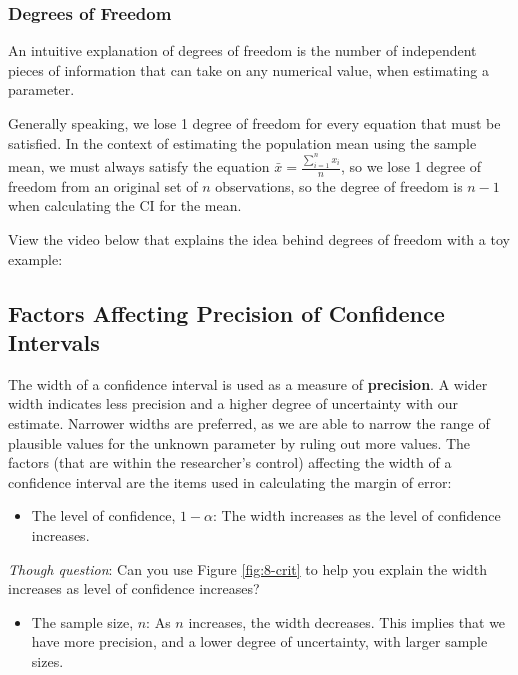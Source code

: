 \documentclass[
]{book}
\providecommand{\tightlist}{%
  \setlength{\itemsep}{0pt}\setlength{\parskip}{0pt}}
\begin{document}
\subsubsection{Degrees of Freedom}\label{degrees-of-freedom}

An intuitive explanation of degrees of freedom is the number of independent pieces of information that can take on any numerical value, when estimating a parameter.

Generally speaking, we lose 1 degree of freedom for every equation that must be satisfied. In the context of estimating the population mean using the sample mean, we must always satisfy the equation \(\bar{x} = \frac{\sum_{i=1}^n x_i}{n}\), so we lose 1 degree of freedom from an original set of \(n\) observations, so the degree of freedom is \(n-1\) when calculating the CI for the mean.

View the video below that explains the idea behind degrees of freedom with a toy example:

\subsection{Factors Affecting Precision of Confidence Intervals}\label{factors-affecting-precision-of-confidence-intervals}

The width of a confidence interval is used as a measure of \textbf{precision}. A wider width indicates less precision and a higher degree of uncertainty with our estimate. Narrower widths are preferred, as we are able to narrow the range of plausible values for the unknown parameter by ruling out more values. The factors (that are within the researcher's control) affecting the width of a confidence interval are the items used in calculating the margin of error:

\begin{itemize}
\tightlist
\item
  The level of confidence, \(1 - \alpha\): The width increases as the level of confidence increases.
\end{itemize}

\emph{Though question}: Can you use Figure \ref{fig:8-crit} to help you explain the width increases as level of confidence increases?

\begin{itemize}
\tightlist
\item
  The sample size, \(n\): As \(n\) increases, the width decreases. This implies that we have more precision, and a lower degree of uncertainty, with larger sample sizes.
\end{itemize}
\end{document}
